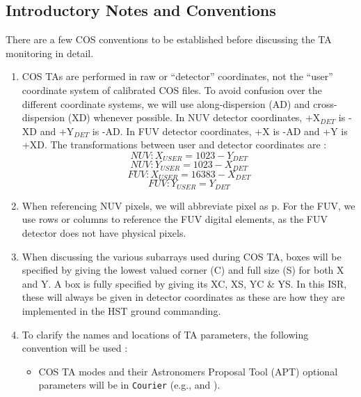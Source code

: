 \subsection{Introductory Notes and Conventions}\label{subsec:conventions}
There are a few COS conventions to be established before discussing the TA monitoring in detail.
\begin{enumerate}
	\item{COS TAs are performed in raw or ``detector'' coordinates, not the ``user'' coordinate system of calibrated
		COS files. To avoid confusion over the different coordinate systems, we will use along-dispersion (AD) and cross-dispersion (XD) whenever possible.
		In NUV detector coordinates, +X$_{DET}$ is -XD and +Y$_{DET}$ is -AD. In FUV detector coordinates, +X is -AD and +Y is +XD.
		The transformations between user and detector coordinates are :
		\begin{equation} NUV: X_{USER} = 1023 - Y_{DET} \label{eq:NUVuserX}\end{equation}
		\begin{equation} NUV: Y_{USER} = 1023 - X_{DET} \label{eq:NUVuserY}\end{equation}
		\begin{equation} FUV: X_{USER} = 16383 - X_{DET} \label{eq:FUVuserX}\end{equation}
		\begin{equation} FUV: Y_{USER} = Y_{DET} \label{eq:FUVuserY}\end{equation}
		}
	\item{When referencing NUV pixels, we will abbreviate pixel as p. For the FUV, we use rows or columns to reference the FUV digital elements, as the FUV detector does not have physical pixels.}
	\item{When discussing the various subarrays used during COS TA, boxes will be specified by giving the lowest
		valued corner (C) and full size (S) for both X and Y. A box is fully specified by giving its XC, XS, YC \& YS. In this ISR, these will always be given in detector coordinates
		as these are how they are implemented in the HST ground commanding.}
	\item{To clarify the names and locations of TA parameters, the following convention will be used :
		\begin{itemize}
			\item{COS TA modes and their Astronomers Proposal Tool (APT) optional parameters will be in \texttt{Courier} (e.g.,  and \numpos).}

\end{itemize}}
\end{enumerate}
